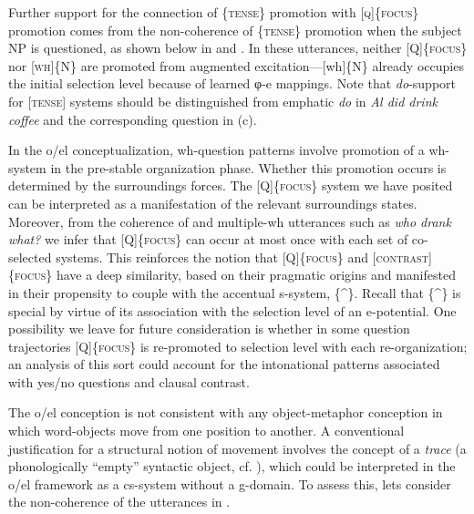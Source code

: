   Further support for the connection of \{\textsc{tense}\} promotion with [\textsc{q}]\{\textsc{focus}\} promotion comes from the non-coherence of \{\textsc{tense}\} promotion when the subject NP is questioned, as shown below in  and . In these utterances, neither [Q]\{\textsc{focus}\} nor [\textsc{wh}]\{N\} are promoted from augmented excitation—[wh]\{N\} already occupies the initial selection level because of learned φ-e mappings. Note that \textit{do}{}-support for [\textsc{tense}] systems should be distinguished from emphatic \textit{do} in \textit{Al did drink coffee} and the corresponding question in (c).  

\ea\label{ex:7:18}
   \label{ex:7:18a}
  \label{ex:7:18b}
  \label{ex:7:18c}
  \z
\z

  In the o/el conceptualization, wh-question patterns involve promotion of a wh-system in the pre-stable organization phase. Whether this promotion occurs is determined by the surroundings forces. The [\textsc{Q}]\{\textsc{focus}\} system we have posited can be interpreted as a manifestation of the relevant surroundings states. Moreover, from the coherence of  and multiple-wh utterances such as \textit{who drank what?} we infer that [Q]\{\textsc{focus}\} can occur at most once with each set of co-selected systems. This reinforces the notion that [Q]\{\textsc{focus}\} and [\textsc{contrast}]\{\textsc{focus}\} have a deep similarity, based on their pragmatic origins and manifested in their propensity to couple with the accentual s-system, \{\^{}\}. Recall that \{\^{}\} is special by virtue of its association with the selection level of an e-potential. One possibility we leave for future consideration is whether in some question trajectories [Q]\{\textsc{focus}\} is re-promoted to selection level with each re-organization; an analysis of this sort could account for the intonational patterns associated with yes/no questions and clausal contrast.

   The o/el conception is not consistent with any object-metaphor conception in which word-objects move from one position to another. A conventional justification for a structural notion of movement involves the concept of a \textit{trace} (a phonologically “empty” syntactic object, cf. \citealt{Chomsky1965}), which could be interpreted in the o/el framework as a cs-system without a g-domain. To assess this, lets consider the non-coherence of the utterances in .

